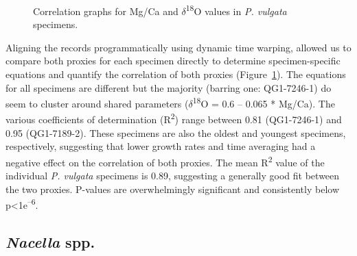 \documentclass[
  authoryear,
  preprint,
  3p]{elsarticle}
\begin{document}
\begin{figure}[H]


\caption{\label{fig-Pat_Corr}Correlation graphs for Mg/Ca and
\(\delta\)\textsuperscript{18}O values in \emph{P. vulgata} specimens.}

\end{figure}%

Aligning the records programmatically using dynamic time warping,
allowed us to compare both proxies for each specimen directly to
determine specimen-specific equations and quantify the correlation of
both proxies (Figure~\ref{fig-Pat_Corr}). The equations for all
specimens are different but the majority (barring one: QG1-7246-1) do
seem to cluster around shared parameters
(\(\delta\)\textsuperscript{18}Ο = 0.6 -- 0.065 * Mg/Ca). The various
coefficients of determination (R\textsuperscript{2}) range between 0.81
(QG1-7246-1) and 0.95 (QG1-7189-2). These specimens are also the oldest
and youngest specimens, respectively, suggesting that lower growth rates
and time averaging had a negative effect on the correlation of both
proxies. The mean R\textsuperscript{2} value of the individual \emph{P.
vulgata} specimens is 0.89, suggesting a generally good fit between the
two proxies. P-values are overwhelmingly significant and consistently
below p\textless1e\textsuperscript{--6}.

\subsection{\texorpdfstring{\emph{Nacella}
spp.}{Nacella spp.}}\label{nacella-spp.}
\end{document}
